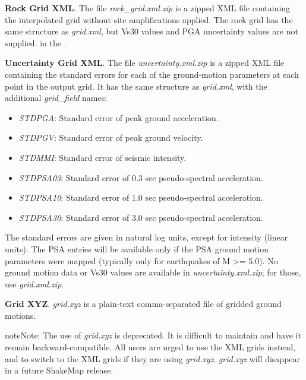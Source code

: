 \documentclass[letterpaper,10pt,english]{sphinxmanual}
\begin{document}
\textbf{Rock Grid XML}. The file \emph{rock\_grid.xml.zip} is a zipped XML file containing
the interpolated grid without site amplifications applied. The rock grid has the
same structure as \emph{grid.xml}, but Vs30 values and PGA uncertainty values are not
supplied. {\hyperref[tg_processing:amplify\string-ground\string-motions]{}} in the {\hyperref[technical_guide:technical\string-guide]{}}.

\textbf{Uncertainty Grid XML}. The file \emph{uncertainty.xml.zip} is a zipped XML file
containing the standard errors for each of the ground-motion parameters at each
point in the output grid. It has the same structure as \emph{grid.xml}, with the
additional \emph{grid\_field} names:
\begin{itemize}
\item {} 
\emph{STDPGA}:     Standard error of peak ground acceleration.

\item {} 
\emph{STDPGV}:     Standard error of peak ground velocity.

\item {} 
\emph{STDMMI}:     Standard error of seismic intensity.

\item {} 
\emph{STDPSA03}:   Standard error of 0.3 sec pseudo-spectral acceleration.

\item {} 
\emph{STDPSA10}:   Standard error of 1.0 sec pseudo-spectral acceleration.

\item {} 
\emph{STDPSA30}:   Standard error of 3.0 sec pseudo-spectral acceleration.

\end{itemize}

The standard errors are given in natural log units, except for intensity (linear
units). The PSA entries will be available only if the PSA ground motion
parameters were mapped (typically only for earthquakes of M \textgreater{}= 5.0). No
ground motion data or Vs30 values are available in
\emph{uncertainty.xml.zip}; for those, use \emph{grid.xml.zip}.

\textbf{Grid XYZ}. \emph{grid.xyz} is a plain-text comma-separated file of gridded ground motions.

\begin{notice}{note}{Note:}
The use of \emph{grid.xyz} is deprecated. It is difficult to maintain and have it remain backward-compatible. All users are urged to use the XML grids instead, and to switch to the XML grids if they are using \emph{grid.xyz}. \emph{grid.xyz} will disappear in a future ShakeMap release.
\end{notice}
\end{document}
